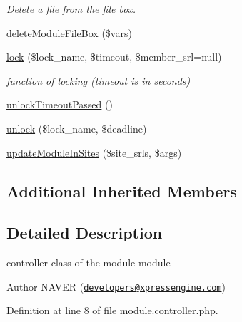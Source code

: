 \begin{DoxyCompactItemize}
\begin{DoxyCompactList}\small\item\em Delete a file from the file box. \end{DoxyCompactList}\item 
\hyperlink{classmoduleController_a26ff8a052af05f873237f3023e3e1bde}{delete\+Module\+File\+Box} (\$vars)
\item 
\hyperlink{classmoduleController_a1395c1be0ebed50078212640fba409be}{lock} (\$lock\+\_\+name, \$timeout, \$member\+\_\+srl=null)
\begin{DoxyCompactList}\small\item\em function of locking (timeout is in seconds) \end{DoxyCompactList}\item 
\hyperlink{classmoduleController_aac97ab294279631cb3cf1078063e8b56}{unlock\+Timeout\+Passed} ()
\item 
\hyperlink{classmoduleController_a79a5d8ecb0bc6186756e80144cbca92f}{unlock} (\$lock\+\_\+name, \$deadline)
\item 
\hyperlink{classmoduleController_a1d2d1c0845ee050c4f837dea9b9beab1}{update\+Module\+In\+Sites} (\$site\+\_\+srls, \$args)
\end{DoxyCompactItemize}
\subsection*{Additional Inherited Members}


\subsection{Detailed Description}
controller class of the module module 

\begin{DoxyAuthor}{Author}
N\+A\+V\+E\+R (\href{mailto:developers@xpressengine.com}{\tt developers@xpressengine.\+com}) 
\end{DoxyAuthor}


Definition at line 8 of file module.\+controller.\+php.



